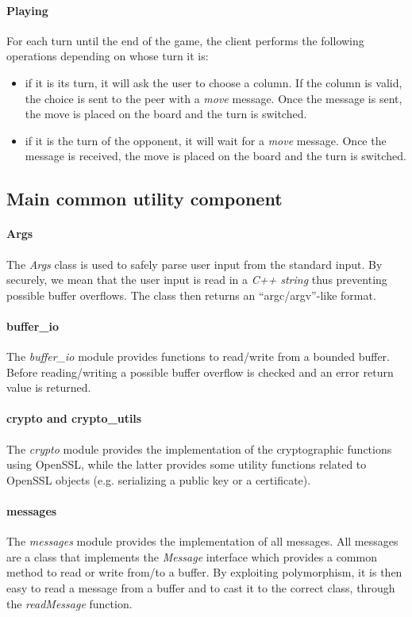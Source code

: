 \paragraph{Playing}
For each turn until the end of the game, the client performs the following 
operations depending on whose turn it is:
\begin{itemize}
    \item if it is its turn, it will ask the user to choose a column. If the 
        column is valid, the choice is sent to the peer with a \emph{move}
        message. Once the message is sent, the move is placed on the board
        and the turn is switched.
    \item if it is the turn of the opponent, it will wait for a \emph{move}
        message. Once the message is received, the move is placed on the board 
        and the turn is switched.
\end{itemize}
 
\subsection{Main common utility component}

\paragraph{Args} 
The \emph{Args} class is used to safely parse user input from the standard 
input. By securely, we mean that the user input is read in a \emph{C++ string}
thus preventing possible buffer overflows. The class then returns an 
``argc/argv''-like format.

\paragraph{buffer\_io}
The \emph{buffer\_io} module provides functions to read/write from a bounded 
buffer. Before reading/writing a possible buffer overflow is checked and an 
error return value is returned.

\paragraph{crypto and crypto\_utils} 
The \emph{crypto} module provides the implementation of the cryptographic 
functions using OpenSSL, while the latter provides some utility functions 
related to OpenSSL objects (e.g. serializing a public key or a certificate).

\paragraph{messages}
The \emph{messages} module provides the implementation of all messages. All 
messages are a class that implements the \emph{Message} interface which 
provides a common method to read or write from/to a buffer.
By exploiting polymorphism, it is then easy to read a message from a buffer and
to cast it to the correct class, through the \emph{readMessage} function.

